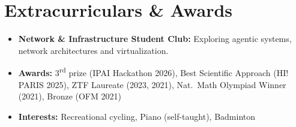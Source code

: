 \documentclass[11pt,a4paper]{moderncv}
\begin{document}
\section{Extracurriculars \& Awards}

\begin{itemize}[leftmargin=.2in]
\item \textbf{Network \& Infrastructure Student Club:} Exploring agentic systems, network architectures and virtualization.
\item \textbf{Awards:} 3\textsuperscript{rd} prize (IPAI Hackathon 2026), Best Scientific Approach (HI! PARIS 2025), ZTF Laureate (2023, 2021), Nat.\ Math Olympiad Winner (2021), Bronze (OFM 2021)
\item \textbf{Interests:} Recreational cycling, Piano (self-taught), Badminton
\end{itemize}
\end{document}
